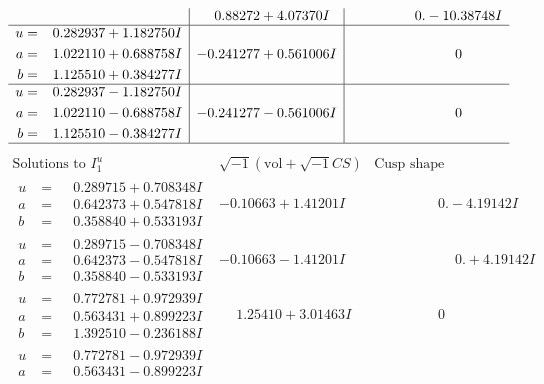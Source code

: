 \documentclass[1p]{elsarticle_modified}
\theoremstyle{definition}
\newcommand{\I}{\sqrt{-1}}
\begin{document}
$$\begin{array}{c|c|c}
 & \phantom{-}0.88272 + 4.07370 I & \phantom{-0.000000 } 0. - 10.38748 I \\ \hline\begin{aligned}
u &= \phantom{-}0.282937 + 1.182750 I \\
a &= \phantom{-}1.022110 + 0.688758 I \\
b &= \phantom{-}1.125510 + 0.384277 I\end{aligned}
 & -0.241277 + 0.561006 I & \phantom{-0.000000 } 0 \\ \hline\begin{aligned}
u &= \phantom{-}0.282937 - 1.182750 I \\
a &= \phantom{-}1.022110 - 0.688758 I \\
b &= \phantom{-}1.125510 - 0.384277 I\end{aligned}
 & -0.241277 - 0.561006 I & \phantom{-0.000000 } 0\\
 \hline 
 \end{array}$$\newpage$$\begin{array}{c|c|c}  
\text{Solutions to }I^u_{1}& \I (\text{vol} + \sqrt{-1}CS) & \text{Cusp shape}\\
 \hline 
\begin{aligned}
u &= \phantom{-}0.289715 + 0.708348 I \\
a &= \phantom{-}0.642373 + 0.547818 I \\
b &= \phantom{-}0.358840 + 0.533193 I\end{aligned}
 & -0.10663 + 1.41201 I & \phantom{-0.000000 } 0. - 4.19142 I \\ \hline\begin{aligned}
u &= \phantom{-}0.289715 - 0.708348 I \\
a &= \phantom{-}0.642373 - 0.547818 I \\
b &= \phantom{-}0.358840 - 0.533193 I\end{aligned}
 & -0.10663 - 1.41201 I & \phantom{-0.000000 -}0. + 4.19142 I \\ \hline\begin{aligned}
u &= \phantom{-}0.772781 + 0.972939 I \\
a &= \phantom{-}0.563431 + 0.899223 I \\
b &= \phantom{-}1.392510 - 0.236188 I\end{aligned}
 & \phantom{-}1.25410 + 3.01463 I & \phantom{-0.000000 } 0 \\ \hline\begin{aligned}
u &= \phantom{-}0.772781 - 0.972939 I \\
a &= \phantom{-}0.563431 - 0.899223 I \\

\end{aligned}
\end{array}$$
\end{document}
